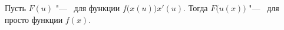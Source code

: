 
  Пусть $F(u)$ "--- \tp\ для функции $f\big(x(u)\big)x'(u)$. Тогда $F\big(u(x)\big)$ "--- \tp\ для просто функции $f(x)$.
